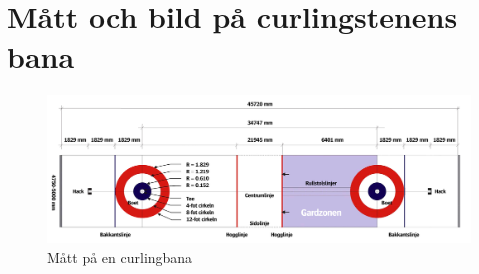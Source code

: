 \documentclass[11pt]{article} %
\begin{document}
\section{\\Mått och bild på curlingstenens bana} \label{App:AppendixB}

\begin{figure}[ht!]
\centering
\includegraphics[width=160mm]{curlingbana.jpg}
\caption{Mått på en curlingbana}
\label{fig:curlbana_riktigt}
\label{overflow}
\end{figure}
\end{document}

